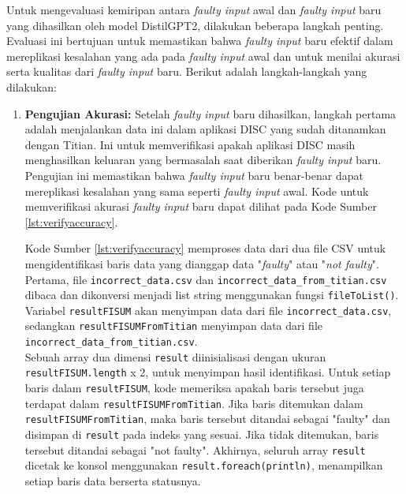 Untuk mengevaluasi kemiripan antara \emph{faulty input} awal dan \emph{faulty input} baru yang dihasilkan oleh model DistilGPT2, dilakukan beberapa langkah penting. Evaluasi ini bertujuan untuk memastikan bahwa \emph{faulty input} baru efektif dalam mereplikasi kesalahan yang ada pada \emph{faulty input} awal dan untuk menilai akurasi serta kualitas dari \emph{faulty input} baru. Berikut adalah langkah-langkah yang dilakukan:

\begin{enumerate}[topsep=0pt]
    \item \textbf{Pengujian Akurasi:}
    Setelah \emph{faulty input} baru dihasilkan, langkah pertama adalah menjalankan data ini dalam aplikasi DISC yang sudah ditanamkan dengan Titian. Ini untuk memverifikasi apakah aplikasi DISC masih menghasilkan keluaran yang bermasalah saat diberikan \emph{faulty input} baru. Pengujian ini memastikan bahwa \emph{faulty input} baru benar-benar dapat mereplikasi kesalahan yang sama seperti \emph{faulty input} awal.
    Kode untuk memverifikasi akurasi \emph{faulty input} baru dapat dilihat pada Kode Sumber \ref{lst:verifyaccuracy}.

    

    Kode Sumber \ref{lst:verifyaccuracy} memproses data dari dua file CSV untuk mengidentifikasi baris data yang dianggap data "\emph{faulty}" atau "\emph{not faulty}". Pertama, file \texttt{incorrect\_data.csv} dan \texttt{incorrect\_data\_from\_titian.csv} dibaca dan dikonversi menjadi list string menggunakan fungsi \texttt{fileToList()}. Variabel \texttt{resultFISUM} akan menyimpan data dari file \texttt{incorrect\_data.csv}, sedangkan \texttt{resultFISUMFromTitian} menyimpan data dari file \texttt{incorrect\_data\_from\_titian.csv}.
    \\

    Sebuah array dua dimensi \texttt{result} diinisialisasi dengan ukuran \texttt{resultFISUM.length} x 2, untuk menyimpan hasil identifikasi. Untuk setiap baris dalam \texttt{resultFISUM}, kode memeriksa apakah baris tersebut juga terdapat dalam \texttt{resultFISUMFromTitian}. Jika baris ditemukan dalam \texttt{resultFISUMFromTitian}, maka baris tersebut ditandai sebagai "faulty" dan disimpan di \texttt{result} pada indeks yang sesuai. Jika tidak ditemukan, baris tersebut ditandai sebagai "not faulty". 
    Akhirnya, seluruh array \texttt{result} dicetak ke konsol menggunakan \texttt{result.foreach(println)}, menampilkan setiap baris data berserta statusnya.



\end{enumerate}

